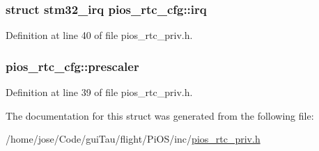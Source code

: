 \hypertarget{structpios__rtc__cfg_aa3d36b543b26502f3063228fc2c69496}{
\subsubsection[{irq}]{\setlength{\rightskip}{0pt plus 5cm}struct {\bf stm32\-\_\-irq} pios\-\_\-rtc\-\_\-cfg\-::irq}}\label{structpios__rtc__cfg_aa3d36b543b26502f3063228fc2c69496}


Definition at line 40 of file pios\-\_\-rtc\-\_\-priv.\-h.

\hypertarget{structpios__rtc__cfg_a9ba0d9532d31cd9ff861f59a2d2d7c98}{
\subsubsection[{prescaler}]{ pios\-\_\-rtc\-\_\-cfg\-::prescaler}}\label{structpios__rtc__cfg_a9ba0d9532d31cd9ff861f59a2d2d7c98}


Definition at line 39 of file pios\-\_\-rtc\-\_\-priv.\-h.



The documentation for this struct was generated from the following file\-:\begin{DoxyCompactItemize}
\item 
/home/jose/\-Code/gui\-Tau/flight/\-Pi\-O\-S/inc/\hyperlink{pios__rtc__priv_8h}{pios\-\_\-rtc\-\_\-priv.\-h}\end{DoxyCompactItemize}
